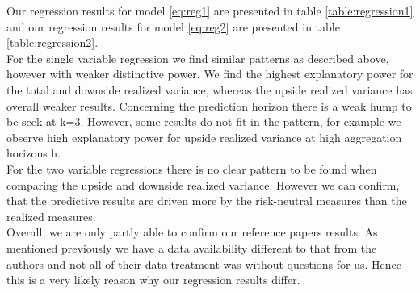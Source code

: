 \documentclass{article}
\begin{document}
Our regression results for model \ref{eq:reg1} are presented in table \ref{table:regression1} and our regression results for model \ref{eq:reg2} are presented in table \ref{table:regression2}.\\

For the single variable regression we find similar patterns as described above, however with weaker distinctive power. We find the highest explanatory power for the total and downside realized variance, whereas the upside realized variance has overall weaker results. Concerning the prediction horizon there is a weak hump to be seek at k=3. However, some results do not fit in the pattern, for example we observe high explanatory power for upside realized variance at high aggregation horizons h.\\

For the two variable regressions there is no clear pattern to be found when comparing the upside and downside realized variance. However we can confirm, that the predictive results are driven more by the risk-neutral measures than the realized measures.\\

Overall, we are only partly able to confirm our reference papers results. As mentioned previously we have a data availability different to that from the authors and not all of their data treatment was without questions for us. Hence this is a very likely reason why our regression results differ. 


\end{document}
